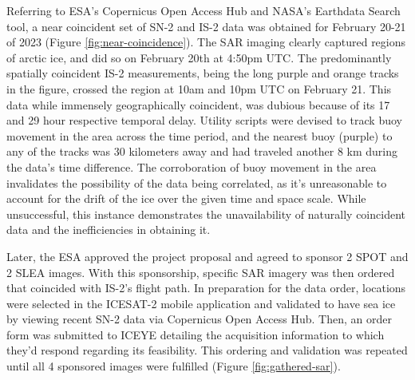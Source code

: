 Referring to ESA's Copernicus Open Access Hub and NASA's Earthdata Search tool, a near coincident set of SN-2 and IS-2 data was obtained for February 20-21 of 2023 (Figure \ref{fig:near-coincidence}). The SAR imaging clearly captured regions of arctic ice, and did so on February 20th at 4:50pm UTC. The predominantly spatially coincident IS-2 measurements, being the long purple and orange tracks in the figure, crossed the region at 10am and 10pm UTC on February 21. This data while immensely geographically coincident, was dubious because of its 17 and 29 hour respective temporal delay. Utility scripts were devised to track buoy movement in the area across the time period, and the nearest buoy (purple) to any of the tracks was 30 kilometers away and had traveled another 8 km during the data's time difference. The corroboration of buoy movement in the area invalidates the possibility of the data being correlated, as it's unreasonable to account for the drift of the ice over the given time and space scale. While unsuccessful, this instance demonstrates the unavailability of naturally coincident data and the inefficiencies in obtaining it.

Later, the ESA approved the project proposal and agreed to sponsor 2 SPOT and 2 SLEA images. With this sponsorship, specific SAR imagery was then ordered that coincided with IS-2's flight path. In preparation for the data order, locations were selected in the ICESAT-2 mobile application and validated to have sea ice by viewing recent SN-2 data via Copernicus Open Access Hub. Then, an order form was submitted to ICEYE detailing the acquisition information to which they'd respond regarding its feasibility. This ordering and validation was repeated until all 4 sponsored images were fulfilled (Figure \ref{fig:gathered-sar}).

